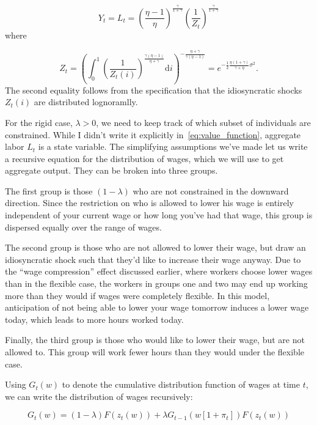 \documentclass[12pt,a4paper]{scrartcl}            %
\begin{document}
\begin{equation}
    \label{eq:output_flexible}
    Y_t = L_t = \left( \frac{\eta - 1}{\eta} \right)^{\frac{\gamma}{1 + \gamma}} \left( \frac{1}{Z_t} \right)^{\frac{\gamma}{1 + \gamma}}
\end{equation}
%
where

\begin{equation}
    Z_t = \left( \int_{0}^{1}\! \left( \frac{1}{Z_t(i)} \right)^{\frac{\gamma(\eta - 1)}{\eta + \gamma}} \mathrm{d}i \right)^{-\frac{\eta + \gamma}{\gamma(\eta - 1)}} \!\!\! = e^{-\frac{1}{2} \frac{\eta(1 + \gamma)}{\gamma + \eta}\sigma^2 }.
\end{equation}
%
The second equality follows from the specification that the idiosyncratic shocks $Z_t(i)$ are distributed lognoramlly.

For the rigid case, $\lambda > 0$, we need to keep track of which subset of individuals are constrained.
While I didn't write it explicitly in~\eqref{eq:value_function}, aggregate labor $L_t$ is a state variable.
The simplifying assumptions we've made let us write a recursive equation for the distribution of wages, which we will use to get aggregate output.
They can be broken into three groups.

The first group is those $(1 - \lambda)$ who are not constrained in the downward direction.
Since the restriction on who is allowed to lower his wage is entirely independent of your current wage or how long you've had that wage, this group is dispersed equally over the range of wages.

The second group is those who are not allowed to lower their wage, but draw an idiosyncratic shock such that they'd like to increase their wage anyway.
Due to the ``wage compression'' effect discussed earlier, where workers choose lower wages than in the flexible case, the workers in groups one and two may end up working more than they would if wages were completely flexible.
In this model, anticipation of not being able to lower your wage tomorrow induces a lower wage today, which leads to more hours worked today.

Finally, the third group is those who would like to lower their wage, but are not allowed to.
This group will work fewer hours than they would under the flexible case.

Using $G_t(w)$ to denote the cumulative distribution function of wages at time $t$, we can write the distribution of wages recursively:

\begin{equation}
    \label{eq:wage_distribution}
    G_t(w) = (1 - \lambda) F(z_t(w)) + \lambda G_{t-1}\left(w[1 + \pi_t]\right)F(z_t(w))
\end{equation}
\end{document}
